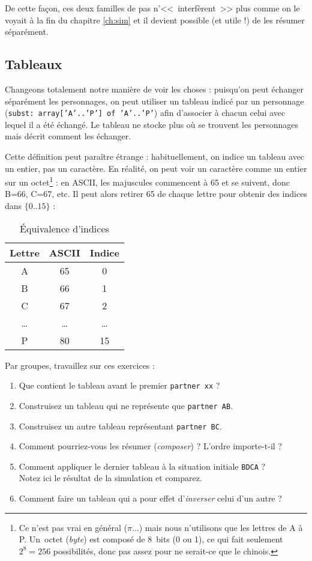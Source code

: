 \documentclass[11pt,a4paper,oneside]{book}
\begin{document}
De cette façon, ces deux familles de pas n'<<~interfèrent~>> plus comme on le
voyait à la fin du chapitre \ref{ch:sim} et
il devient possible (et utile !) de les résumer séparément.

\subsection{Tableaux}
Changeons totalement notre manière de voir les choses : puisqu'on peut échanger
séparément les personnages, on peut utiliser un tableau indicé
par un personnage (\texttt{subst: array['A'..'P'] of 'A'..'P'}) afin d'associer
à chacun celui avec lequel il a été échangé.
Le tableau ne stocke plus où se trouvent les personnages mais décrit
comment les échanger.

Cette définition peut paraître étrange : habituellement, on indice un tableau
avec un entier, pas un caractère. En réalité, on peut voir un caractère
comme un entier sur un octet\footnote{Ce n'est pas vrai en général ($\pi$...)
mais nous n'utilisons que les lettres de A à P. Un~octet (\emph{byte}) est
composé de 8~bits (0 ou 1), ce qui fait seulement $2^8=256$ possibilités, donc
pas assez pour ne serait-ce que le chinois.} : en ASCII,
les majuscules commencent à 65 et se suivent, donc B=66, C=67, etc. Il peut
alors retirer 65 de chaque lettre pour obtenir des indices dans $\{0..15\}$ :

\begin{table}[h]
\center
\begin{tabular}{c|c|c}
Lettre & ASCII & Indice \\ \hline\hline
A & 65 & 0 \\ \hline
B & 66 & 1 \\ \hline
C & 67 & 2 \\ \hline
\dots & \dots & \dots \\ \hline
P & 80 & 15
\end{tabular}
\caption{Équivalence d'indices}
\end{table}

Par groupes, travaillez sur ces exercices :
\begin{enumerate}
\item \boxes Que contient le tableau avant le premier \texttt{partner xx} ?
\item \boxes Construisez un tableau qui ne représente que \texttt{partner AB}.
\item \boxes Construisez un autre tableau représentant \texttt{partner BC}.
\item \boxes Comment pourriez-vous les résumer (\emph{composer}) ?
	L'ordre importe-t-il ?
\item \boxes Comment appliquer le dernier tableau à la
		situation initiale \texttt{BDCA} ? \\
	\boxes Notez ici le résultat de la simulation et comparez.
\item \boxes Comment faire un tableau qui a pour effet d'\emph{inverser} celui
	d'un autre ?
\end{enumerate}
\end{document}
